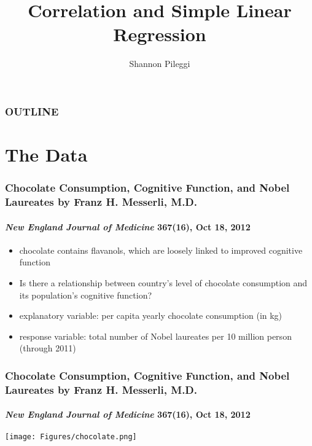 





\title[Unit 3 Deck 3]{Correlation and Simple Linear Regression}
\author[Pileggi]{Shannon Pileggi}


\date{}




\begin{frame}
\titlepage
\end{frame}

\begin{frame}
\frametitle{OUTLINE\qquad\qquad\qquad} \tableofcontents[hideallsubsections]
\end{frame}


\section[The Data]{The Data}

\begin{frame}
\frametitle{Chocolate Consumption, Cognitive Function,
and Nobel Laureates by Franz H. Messerli, M.D.}
\framesubtitle{\emph{New England Journal of Medicine} 367(\textbf{16}), Oct 18, 2012}
\begin{itemize}
    \item
    chocolate contains flavanols, which are loosely linked to improved cognitive function
    \item
    Is there a relationship between country's level of chocolate consumption and its population's cognitive function?
    \item
    explanatory variable: per capita yearly chocolate consumption (in kg)
    \item
    response variable: total number of Nobel laureates per 10 million person (through 2011)
\end{itemize}
\end{frame}

\begin{frame}
\frametitle{Chocolate Consumption, Cognitive Function,
and Nobel Laureates by Franz H. Messerli, M.D.}
\framesubtitle{\emph{New England Journal of Medicine} 367(\textbf{16}), Oct 18, 2012}
\begin{center}
\texttt{[image: Figures/chocolate.png]}
\end{center}
\end{frame}


